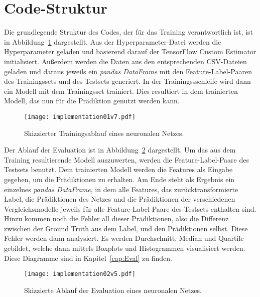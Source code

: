 
\section{Code-Struktur}

Die grundlegende Struktur des Codes, der für das Training verantwortlich ist, ist in Abbildung~\ref{fig:impl01} dargestellt.
Aus der Hyperparameter-Datei werden die Hyperparameter geladen und basierend darauf der TensorFlow Custom Estimator initialisiert.
Außerdem werden die Daten aus den entsprechenden CSV-Dateien geladen 
und daraus jeweils ein \textit{pandas DataFrame} mit den Feature-Label-Paaren des Trainingssets und des Testsets generiert.
In der Trainingssschleife wird dann ein Modell mit dem Trainingsset trainiert.
Dies resultiert in dem trainierten Modell, das nun für die Prädiktion genutzt werden kann.

\begin{figure}[p]
    \centering
    \texttt{[image: implementation01v7.pdf]}
    \caption{Skizzierter Trainingsablauf eines neuronalen Netzes.}
    \label{fig:impl01}
\end{figure}


Der Ablauf der Evaluation ist in Abbildung~\ref{fig:impl02} dargestellt. 
Um das aus dem Training resultierende Modell auszuwerten, werden die Feature-Label-Paare des Testsets benutzt.
Dem trainierten Modell werden die Features als Eingabe gegeben, um die Prädiktionen zu erhalten.
Am Ende steht als Ergebnis ein einzelnes \textit{pandas DataFrame}, in dem alle Features, das zurücktransformierte Label, 
die Prädiktionen des Netzes und die Prädiktionen der verschiedenen Vergleichsmodelle jeweils für alle Feature-Label-Paare des Testsets enthalten sind.
Hinzu kommen noch die Fehler all dieser Prädiktionen, also die Differenz zwischen der Ground Truth aus dem Label, und den Prädiktionen selbst.
Diese Fehler werden dann analysiert.
Es werden Durchschnitt, Median und Quartile gebildet, welche dann mittels Boxplots und Histogrammen visualisiert werden.
Diese Diagramme sind in Kapitel~\ref{cap:Eval} zu finden.



\begin{figure}[p]
    \centering
    \texttt{[image: implementation02v5.pdf]}
    \caption{Skizzierte Ablauf der Evaluation eines neuronalen Netzes.}
    \label{fig:impl02}
\end{figure}


